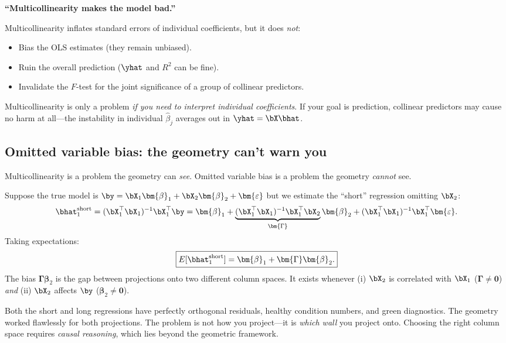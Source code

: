 \begin{misconception}
\textbf{``Multicollinearity makes the model bad.''}

Multicollinearity inflates standard errors of individual coefficients,
but it does \emph{not}:
\begin{itemize}[nosep]
  \item Bias the OLS estimates (they remain unbiased).
  \item Ruin the overall prediction ($\yhat$ and $R^2$ can be fine).
  \item Invalidate the $F$-test for the joint significance of a group
        of collinear predictors.
\end{itemize}
Multicollinearity is only a problem \emph{if you need to interpret
individual coefficients}.
If your goal is prediction, collinear predictors may cause no harm
at all---the instability in individual $\hat{\beta}_j$ averages out in
$\yhat = \bX\bhat$.
\end{misconception}

\subsection{Omitted variable bias: the geometry can't warn you}

\begin{warning}
Multicollinearity is a problem the geometry can \emph{see}.
Omitted variable bias is a problem the geometry \emph{cannot} see.
\end{warning}

Suppose the true model is
$\by = \bX_1\bm{\beta}_1 + \bX_2\bm{\beta}_2 + \bm{\varepsilon}$
but we estimate the ``short'' regression omitting $\bX_2$:
\[
  \bhat_1^{\text{short}}
  = (\bX_1^\top\bX_1)^{-1}\bX_1^\top\by
  = \bm{\beta}_1 + \underbrace{(\bX_1^\top\bX_1)^{-1}\bX_1^\top\bX_2}_{\bm{\Gamma}}\bm{\beta}_2
    + (\bX_1^\top\bX_1)^{-1}\bX_1^\top\bm{\varepsilon}.
\]
Taking expectations:
\begin{equation}\label{eq:ovb}
  \boxed{
  E[\bhat_1^{\text{short}}] = \bm{\beta}_1 + \bm{\Gamma}\bm{\beta}_2.
  }
\end{equation}
The bias $\bm{\Gamma}\bm{\beta}_2$ is the gap between projections onto
two different column spaces.
It exists whenever (i) $\bX_2$ is correlated with $\bX_1$
($\bm{\Gamma}\ne\bm{0}$) \emph{and} (ii) $\bX_2$ affects $\by$
($\bm{\beta}_2\ne\bm{0}$).

Both the short and long regressions have perfectly orthogonal residuals,
healthy condition numbers, and green diagnostics.
The geometry worked flawlessly for both projections.
The problem is not how you project---it is \emph{which wall} you
project onto.
Choosing the right column space requires \emph{causal reasoning},
which lies beyond the geometric framework.


